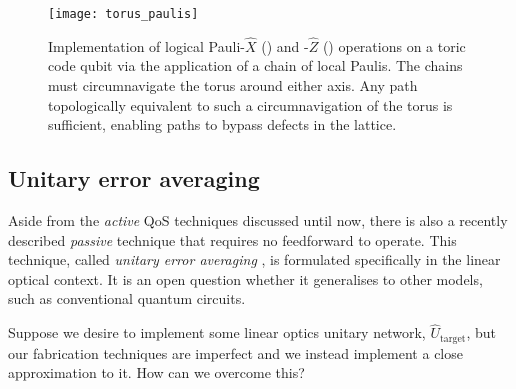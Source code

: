\begin{figure}[htpb]
	\texttt{[image: torus\_paulis]}
	\caption{Implementation of logical Pauli-$\hat{X}$ () and -$\hat{Z}$ () operations on a toric code qubit via the application of a chain of local Paulis. The chains must circumnavigate the torus around either axis. Any path topologically equivalent to such a circumnavigation of the torus is sufficient, enabling paths to bypass defects in the lattice.} \label{fig:toric_code_paulis}
\end{figure}









%
%

\subsection{Unitary error averaging} \label{sec:error_averaging}

Aside from the \textit{active} QoS techniques discussed until now, there is also a recently described \textit{passive} technique that requires no feedforward to operate. This technique, called \textit{unitary error averaging} \cite{MarshmanLundRohde}, is formulated specifically in the linear optical context. It is an open question whether it generalises to other models, such as conventional quantum circuits.

Suppose we desire to implement some linear optics unitary network, $\hat{U}_\mathrm{target}$, but our fabrication techniques are imperfect and we instead implement a close approximation to it. How can we overcome this?


